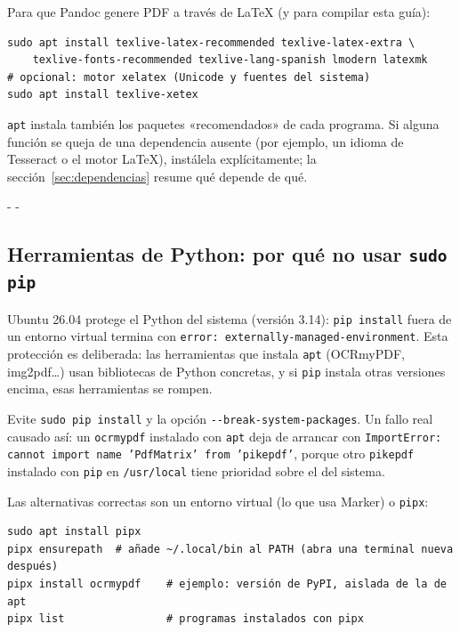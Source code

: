 \documentclass[11pt,a4paper]{article}
\makeatletter
\newcommand{\necesitaespacio}[1]{\par\penalty-100\begingroup
	\setlength{\dimen@}{#1}\dimen@ii\pagegoal\advance\dimen@ii-\pagetotal
	\ifdim\dimen@>\dimen@ii\ifdim\dimen@ii>\z@\vfil\fi\penalty-\@M\fi\endgroup}
\newcommand{\cmd}[1]{\texttt{\textcolor{colcmd}{#1}}}      %
\newcommand{\opt}[1]{\texttt{\textcolor{colopt}{#1}}}      %
\newcommand{\arch}[1]{\texttt{\textcolor{colarch}{#1}}}    %
\makeatother
\begin{document}
	Para que Pandoc genere PDF a través de LaTeX (y para compilar esta guía):
	
	\begin{lstlisting}
sudo apt install texlive-latex-recommended texlive-latex-extra \
    texlive-fonts-recommended texlive-lang-spanish lmodern latexmk
# opcional: motor xelatex (Unicode y fuentes del sistema)
sudo apt install texlive-xetex
\end{lstlisting}
	
	\begin{nota}
		\cmd{apt} instala también los paquetes «recomendados» de cada programa. Si alguna función se queja de una dependencia ausente (por ejemplo, un idioma de Tesseract o el motor LaTeX), instálela explícitamente; la sección~\ref{sec:dependencias} resume qué depende de qué.
	\end{nota}
	
	\necesitaespacio{8\baselineskip}
	\subsection{Herramientas de Python: por qué no usar \texttt{sudo pip}}\label{sec:pep668}
	
	Ubuntu 26.04 protege el Python del sistema (versión 3.14): \cmd{pip install} fuera de un entorno virtual termina con \texttt{error: externally-\allowbreak{}managed-\allowbreak{}environment}. Esta protección es deliberada: las herramientas que instala \cmd{apt} (OCRmyPDF, img2pdf\ldots) usan bibliotecas de Python concretas, y si \cmd{pip} instala otras versiones encima, esas herramientas se rompen.
	
	\begin{importante}
		Evite \cmd{sudo pip install} y la opción \opt{-{}-break-\allowbreak{}system-\allowbreak{}packages}. Un fallo real causado así: un \cmd{ocrmypdf} instalado con \cmd{apt} deja de arrancar con \texttt{ImportError: cannot import name 'PdfMatrix' from 'pikepdf'}, porque otro \texttt{pikepdf} instalado con \cmd{pip} en \arch{/usr/local} tiene prioridad sobre el del sistema.
	\end{importante}
	
	Las alternativas correctas son un entorno virtual (lo que usa Marker) o \cmd{pipx}:
	
	\begin{lstlisting}
sudo apt install pipx
pipx ensurepath  # añade ~/.local/bin al PATH (abra una terminal nueva después)
pipx install ocrmypdf    # ejemplo: versión de PyPI, aislada de la de apt
pipx list                # programas instalados con pipx
\end{lstlisting}
	\vspace{-0.2cm}
	
\end{document}

